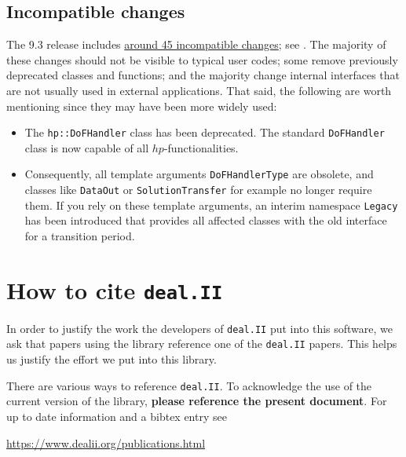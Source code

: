 \documentclass{ansarticle-preprint}
\newcommand{\specialword}[1]{\texttt{#1}}
\newcommand{\dealii}{{\specialword{deal.II}}\xspace}
\begin{document}
\subsection{Incompatible changes}\label{subsec:deprecated}

The 9.3 release includes
\href{https://dealii.org/developer/doxygen/deal.II/changes_between_9_2_0_and_9_3_0.html}
{around 45 incompatible changes}; see \cite{changes93}. The majority of these changes
should not be visible to typical user codes; some remove previously
deprecated classes and functions; and the majority change internal
interfaces that are not usually used in external
applications. That said, the following are worth mentioning since they
may have been more widely used:
\begin{itemize}
  \item The \texttt{hp::DoFHandler} class has been deprecated. The standard
        \texttt{DoFHandler} class is now capable of all $hp$-functionalities.
  \item Consequently, all template arguments \texttt{DoFHandlerType} are obsolete,
        and classes like \texttt{DataOut} or \texttt{SolutionTransfer} for example
        no longer require them. If you rely on these template arguments, an interim
        namespace \texttt{Legacy} has been introduced that provides all affected
        classes with the old interface for a transition period.
\end{itemize}



\section{How to cite \dealii}\label{sec:cite}

In order to justify the work the developers of \dealii{} put into this
software, we ask that papers using the library reference one of the
\dealii{} papers. This helps us justify the effort we put into this library.

There are various ways to reference \dealii{}. To acknowledge the use of
the current version of the library, \textbf{please reference the present
  document}. For up to date information and a bibtex entry
see
\begin{center}
  \url{https://www.dealii.org/publications.html}
\end{center}
\end{document}
